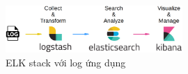 \begin{figure}[H] %
    \centering %
    \includegraphics[width=0.6\textwidth]{figures/elk_01.png} 
    \caption{ELK stack với log ứng dụng} %
    \label{fig:elk_01}
\end{figure}